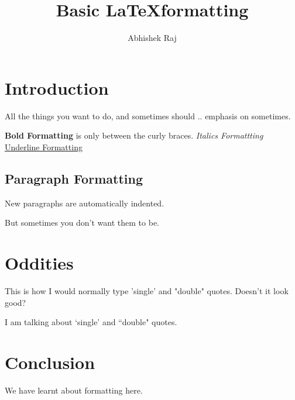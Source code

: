 \documentclass{article}
\title{Basic \LaTeX formatting}
\author{Abhishek Raj}
\begin{document}
	\maketitle
	
	\section{Introduction}
	All the things you want to do, and sometimes should .. emphasis on sometimes.
	
	\textbf{Bold Formatting} is only between the curly braces.
	\emph{Italics Formattting} 
	\underline{Underline Formatting}
	
	\subsection{Paragraph Formatting}
	New paragraphs are automatically indented.
	
	\noindent But sometimes you don't want them to be.
	
	\section{Oddities}
	This is how I would normally type 'single' and "double" quotes. Doesn't it look good?
	
	I am talking about `single' and ``double" quotes.
	
	\section{Conclusion}
	We have learnt about formatting here.
	
\end{document}
